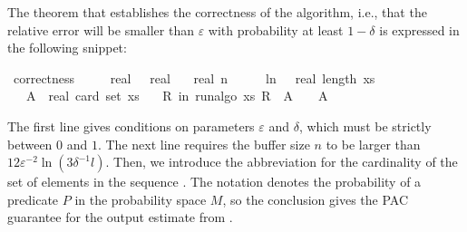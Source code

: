 The theorem that establishes the correctness of the algorithm, i.e., that the relative error will be smaller than $\varepsilon$ with probability at least $1-\delta$ is expressed in the following snippet:
\begin{isabelle_cm}
\isamarkupfalse%
\ correctness{\isacharcolon}{\kern0pt}\isanewline
\ \ \ {\isacartoucheopen}{\isasymepsilon}\ {\isasymin}\ {\isacharbraceleft}{\kern0pt}{}{\isacharless}{\kern0pt}{\isachardot}{\kern0pt}{\isachardot}{\kern0pt}{\isacharless}{\kern0pt}{}{\isacharcolon}{\kern0pt}{\isacharcolon}{\kern0pt}real{\isacharbraceright}{\kern0pt}{\isacartoucheclose}\ {\isacartoucheopen}{\isasymdelta}\ {\isasymin}\ {\isacharbraceleft}{\kern0pt}{}{\isacharless}{\kern0pt}{\isachardot}{\kern0pt}{\isachardot}{\kern0pt}{\isacharless}{\kern0pt}{}{\isacharcolon}{\kern0pt}{\isacharcolon}{\kern0pt}real{\isacharbraceright}{\kern0pt}{\isacartoucheclose}\isanewline
\ \ \ {\isacartoucheopen}real\ n\ {\isasymge}\ {}{}\ {\isacharslash}{\kern0pt}\ {\isasymepsilon}\ {\isacharasterisk}{\kern0pt}\ ln\ {\isacharparenleft}{\kern0pt}{}\ {\isacharasterisk}{\kern0pt}\ real\ {\isacharparenleft}{\kern0pt}length\ xs{\isacharparenright}{\kern0pt}\ {\isacharslash}{\kern0pt}\ {\isasymdelta}{\isacharparenright}{\kern0pt}{\isacartoucheclose}\isanewline
\ \ \ {\isacartoucheopen}A\ {\isasymequiv}\ real\ {\isacharparenleft}{\kern0pt}card\ {\isacharparenleft}{\kern0pt}set\ xs{\isacharparenright}{\kern0pt}{\isacharparenright}{\kern0pt}{\isacartoucheclose}\isanewline
\ \ \ {\isacartoucheopen}{\isasymP}{\isacharparenleft}{\kern0pt}R\ in\ run{\isacharunderscore}{\kern0pt}algo\ xs{\isachardot}{\kern0pt}\ {\isasymbar}R\ {\isacharminus}{\kern0pt}\ A{\isasymbar}\ {\isachargreater}{\kern0pt}\ {\isasymepsilon}\ {\isacharasterisk}{\kern0pt}\ A{\isacharparenright}{\kern0pt}\ {\isasymle}\ {\isasymdelta}{\isacartoucheclose}
\end{isabelle_cm}
The first line gives conditions on parameters $\varepsilon$ and $\delta$, which must be strictly between $0$ and $1$.
The next line requires the buffer size $n$ to be larger than $12 \varepsilon^{-2} \ln ( 3 \delta^{-1} l)$.
Then, we introduce the abbreviation  for the cardinality of the set of elements in the sequence .
The notation  denotes the probability of a predicate $P$ in the probability space $M$, so the conclusion gives the PAC guarantee for the output estimate  from .

